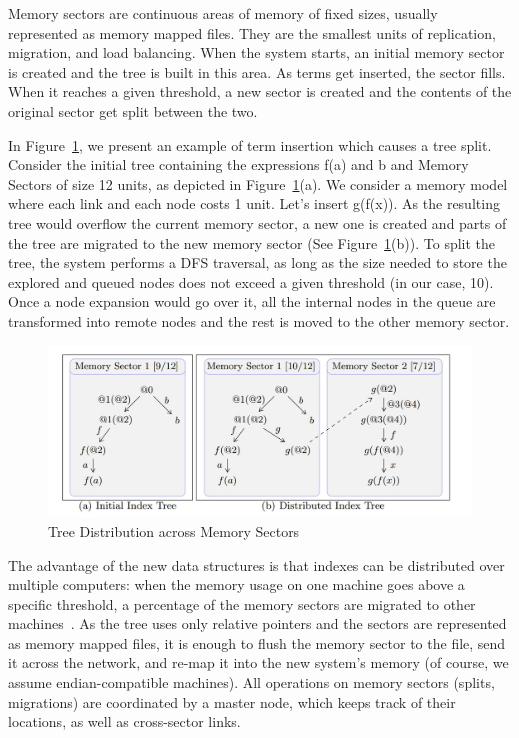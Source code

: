 \documentclass{deliverablereport}
\begin{document}
Memory sectors are continuous areas of memory of fixed sizes, usually represented as memory mapped files. They are the smallest units of replication, migration, and load balancing. When the system starts, an initial memory sector is created and the tree is built in this area. As terms get inserted, the sector fills. When it reaches a given threshold, a new sector is created and the contents of the original sector get split between the two. 

In Figure~\ref{fig:memory_sectors}, we present an example of term insertion which causes a tree split. Consider the initial tree containing the expressions f(a) and b and Memory Sectors of size 12 units, as depicted in Figure~\ref{fig:memory_sectors}(a). We consider a memory model where each link and each node costs 1 unit. Let’s insert g(f(x)). As the resulting tree would overflow the current memory sector, a new one is created and parts of the tree are migrated to the new memory sector (See Figure~\ref{fig:memory_sectors}(b)). To split the tree, the system performs a DFS traversal, as long as the size needed to store the explored and queued nodes does not exceed a given threshold (in our case, 10). Once a node expansion would go over it, all the internal nodes in the queue are transformed into remote nodes and the rest is moved to the other memory sector. 

\begin{figure}[h]
\centering
 \includegraphics[scale=0.6]{figure4.jpg}
 \caption{Tree Distribution across Memory Sectors}
 \label{fig:memory_sectors}
\end{figure}

The advantage of the new data structures is that indexes can be distributed over multiple
computers: when the memory usage on one machine goes above a specific threshold, a
percentage of the memory sectors are migrated to other
machines~\cite{ProKoh:mwsofse11}. As the tree uses only relative pointers and the sectors
are represented as memory mapped files, it is enough to flush the memory sector to the
file, send it across the network, and re-map it into the new system’s memory (of course,
we assume endian-compatible machines). All operations on memory sectors (splits,
migrations) are coordinated by a master node, which keeps track of their locations, as
well as cross-sector links.
\end{document}
